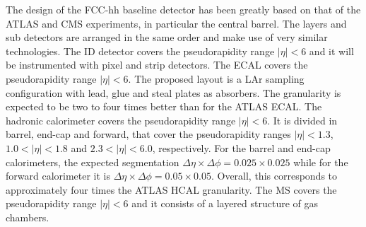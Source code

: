 The design of the FCC-hh baseline detector has been greatly based on that of the ATLAS and CMS experiments, in particular the central barrel. The layers and sub detectors are arranged in the same order and make use of very similar technologies. The ID detector covers the pseudorapidity range $|\eta|<6$ and it will be instrumented with pixel and strip detectors. The ECAL covers the pseudorapidity range $|\eta|<6$. The proposed layout is a LAr sampling configuration with lead, glue and steal plates as absorbers. The granularity is expected to be two to four times better than for the ATLAS ECAL. The hadronic calorimeter covers the pseudorapidity range $|\eta| < 6$. It is divided in barrel, end-cap and forward, that cover the pseudorapidity ranges $|\eta| < 1.3$, $1.0 < |\eta| < 1.8$ and $2.3 < |\eta| < 6.0$, respectively. For the barrel and end-cap calorimeters, the expected segmentation $\Delta\eta\times\Delta\phi = 0.025 \times 0.025$ while for the forward calorimeter it is $\Delta\eta\times\Delta\phi = 0.05 \times 0.05$. Overall, this corresponds to approximately four times the ATLAS HCAL granularity. The MS covers the pseudorapidity range $|\eta|<6$ and it consists of a layered structure of gas chambers.